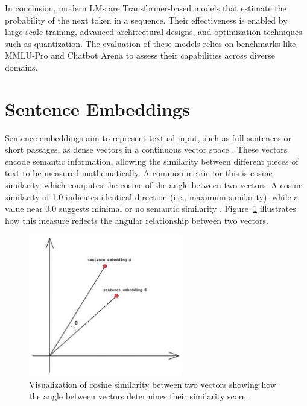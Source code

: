 \documentclass[a4paper,oneside,bibliography=totoc]{scrbook}
\begin{document}
In conclusion, modern \acp{LM} are Transformer-based models that estimate the probability of the next token in a sequence. Their effectiveness is enabled by large-scale training, advanced architectural designs, and optimization techniques such as quantization. The evaluation of these models relies on benchmarks like MMLU-Pro and Chatbot Arena to assess their capabilities across diverse domains.

\section{Sentence Embeddings}
\label{sec:sentence_embeddings}

Sentence embeddings aim to represent textual input, such as full sentences or short passages, as dense vectors in a continuous vector space \cite{Singhal2001}. These vectors encode semantic information, allowing the similarity between different pieces of text to be measured mathematically. A common metric for this is cosine similarity, which computes the cosine of the angle between two vectors. A cosine similarity of 1.0 indicates identical direction (i.e., maximum similarity), while a value near 0.0 suggests minimal or no semantic similarity \cite{Singhal2001}. Figure~\ref{fig:cosine_similarity} illustrates how this measure reflects the angular relationship between two vectors.

\begin{figure}[t]
  \centering
  \includegraphics[width=0.6\textwidth]{figures/cosine_similarity.jpeg}
  \caption[Visualization of cosine similarity between two vectors showing how the angle between vectors determines their similarity score]{Visualization of cosine similarity between two vectors showing how the angle between vectors determines their similarity score. \cite{Leys2022}}
  \label{fig:cosine_similarity}
\end{figure}
\end{document}
